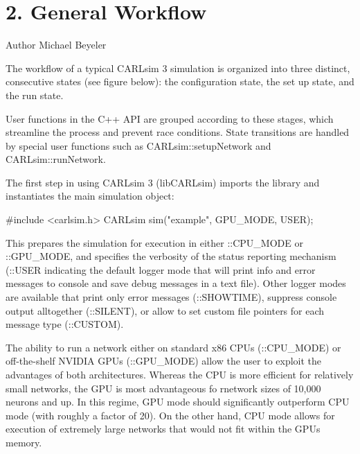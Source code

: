 \hypertarget{ch2_basic_concepts_ch2s1_general_workflow}{}\section{2. General Workflow}\label{ch2_basic_concepts_ch2s1_general_workflow}
\begin{DoxyAuthor}{Author}
Michael Beyeler
\end{DoxyAuthor}
The workflow of a typical C\+A\+R\+Lsim 3 simulation is organized into three distinct, consecutive states (see figure below)\+: the configuration state, the set up state, and the run state.

User functions in the C++ A\+PI are grouped according to these stages, which streamline the process and prevent race conditions. State transitions are handled by special user functions such as C\+A\+R\+Lsim\+::setup\+Network and C\+A\+R\+Lsim\+::run\+Network.

 The first step in using C\+A\+R\+Lsim 3 ({\ttfamily lib\+C\+A\+R\+Lsim}) imports the library and instantiates the main simulation object\+: 
\begin{DoxyCode}
\textcolor{preprocessor}{#include <carlsim.h>}
CARLsim sim(\textcolor{stringliteral}{"example"}, GPU\_MODE, USER);
\end{DoxyCode}
 This prepares the simulation for execution in either \+::\+C\+P\+U\+\_\+\+M\+O\+DE or \+::\+G\+P\+U\+\_\+\+M\+O\+DE, and specifies the verbosity of the status reporting mechanism (\+::\+U\+S\+ER indicating the default logger mode that will print info and error messages to console and save debug messages in a text file). Other logger modes are available that print only error messages (\+::\+S\+H\+O\+W\+T\+I\+ME), suppress console output alltogether (\+::\+S\+I\+L\+E\+NT), or allow to set custom file pointers for each message type (\+::\+C\+U\+S\+T\+OM).

The ability to run a network either on standard x86 C\+P\+Us (\+::\+C\+P\+U\+\_\+\+M\+O\+DE) or off-\/the-\/shelf N\+V\+I\+D\+IA G\+P\+Us (\+::\+G\+P\+U\+\_\+\+M\+O\+DE) allow the user to exploit the advantages of both architectures. Whereas the C\+PU is more efficient for relatively small networks, the G\+PU is most advantageous fo rnetwork sizes of 10,000 neurons and up. In this regime, G\+PU mode should significantly outperform C\+PU mode (with roughly a factor of 20). On the other hand, C\+PU mode allows for execution of extremely large networks that would not fit within the G\+PU\textquotesingle{}s memory.

